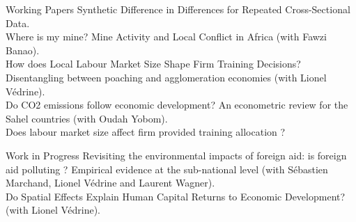 \documentclass{resume} %
\begin{document}
\begin{rSection}{Working Papers}
\vspace*{4mm}
Synthetic Difference in Differences for Repeated Cross-Sectional Data. \\

Where is my mine? Mine Activity and Local Conflict in Africa (with Fawzi Banao).\\

How does Local Labour Market Size Shape Firm Training Decisions? Disentangling between poaching and agglomeration economies (with Lionel Védrine).\\

Do CO2 emissions follow economic development? An econometric review for the Sahel countries (with Oudah Yobom).\\


Does labour market size affect firm provided training allocation ? 
\end{rSection}
\begin{rSection}{Work in Progress}
\vspace*{4mm}
Revisiting the environmental impacts of foreign aid: is foreign aid polluting ? Empirical evidence at the sub-national level (with Sébastien Marchand, Lionel Védrine and Laurent Wagner).\\

Do Spatial Effects Explain Human Capital Returns to Economic Development? (with Lionel Védrine).
\end{rSection}
\newpage
\end{document}
